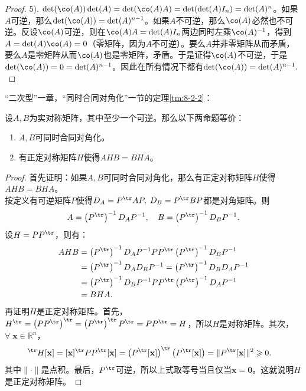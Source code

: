 \documentclass[12pt,UTF8,fontset=none]{ctexbook}
\begin{document}
\begin{appendix}
\begin{proof}
    5). $\det(\co(A))\det(A) = \det(\co(A)A) = \det(\det(A)I_n) = \det(A)^{n}$。如果$A$可逆，那么$\det(\co(A)) = \det(A)^{n-1}$。如果$A$不可逆，那么$\co(A)$必然也不可逆。反设$\co(A)$可逆，则在$\co(A)A = \det(A)I_n$两边同时左乘$\co(A)^{-1}$，得到$A = \det(A)\co(A) = 0$（零矩阵，因为$A$不可逆）。要么$A$并非零矩阵从而矛盾，要么$A$是零矩阵从而$\co(A)$也是零矩阵，矛盾。于是证得$\co(A)$不可逆，于是$\det(\co(A)) = 0 = \det(A)^{n-1}$。因此在所有情况下都有$\det(\co(A)) = \det(A)^{n-1}.$
\end{proof}

“二次型”一章，“同时合同对角化”一节的定理\ref{tm:8-2-2}：
\begin{tm}\label{c-30}
    设$A,B$为实对称矩阵，其中至少一个可逆。那么以下两命题等价：
    \begin{enumerate}
        \item $A,B$可同时合同对角化。
        \item 有正定对称矩阵$H$使得$AHB=BHA$。
    \end{enumerate}
\end{tm}

\begin{proof}
    首先证明：如果$A,B$可同时合同对角化，那么有正定对称矩阵$H$使得$AHB=BHA$。\\
    按定义有可逆矩阵$P$使得$D_A = P^{\tr}AP,\; D_B = P^{\tr}BP$都是对角矩阵。则
    $$A = \left(P^{\tr}\right)^{-1}D_AP^{-1}, \quad B = \left(P^{\tr}\right)^{-1}D_BP^{-1}.$$
    设$H = PP^{\tr}$，则有：
    \begin{align*}
        AHB &= \left(P^{\tr}\right)^{-1}D_AP^{-1}PP^{\tr}\left(P^{\tr}\right)^{-1}D_BP^{-1} \\
        &= \left(P^{\tr}\right)^{-1}D_AD_BP^{-1} = \left(P^{\tr}\right)^{-1}D_BD_AP^{-1} \\
        &= \left(P^{\tr}\right)^{-1}D_BP^{-1}PP^{\tr}\left(P^{\tr}\right)^{-1}D_AP^{-1} \\
        &= BHA.
    \end{align*}
    再证明$H$是正定对称矩阵。首先，$H^{\tr} = \left(PP^{\tr}\right)^{\tr} = \left(P^{\tr}\right)^{\tr}P^{\tr} = PP^{\tr} = H$，所以$H$是对称矩阵。其次，$\forall \;\mathbf{x}\in\mathbb{R}^n$，
    \begin{align*}
        [\mathbf{x}]^{\tr}H[\mathbf{x}] &= [\mathbf{x}]^{\tr}PP^{\tr}[\mathbf{x}] = \left(P^{\tr}[\mathbf{x}]\right)^{\tr}\left(P^{\tr}[\mathbf{x}]\right) = \|P^{\tr}[\mathbf{x}]\|^2 \geqslant 0.
    \end{align*} 
    其中$\|\cdot \|$是点积。最后，$P^{\tr}$可逆，所以上式取等号当且仅当$\mathbf{x} = \mathbf{0}$。这就说明$H$是正定对称矩阵。
    

\end{proof}
\end{appendix}
\end{document}
